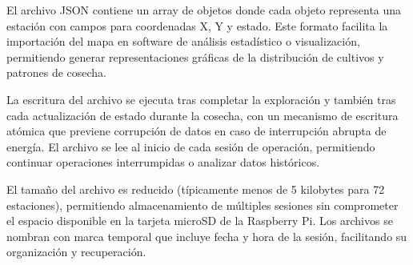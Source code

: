 El archivo JSON contiene un array de objetos donde cada objeto representa una estación con campos para coordenadas X, Y y estado. Este formato facilita la importación del mapa en software de análisis estadístico o visualización, permitiendo generar representaciones gráficas de la distribución de cultivos y patrones de cosecha.

La escritura del archivo se ejecuta tras completar la exploración y también tras cada actualización de estado durante la cosecha, con un mecanismo de escritura atómica que previene corrupción de datos en caso de interrupción abrupta de energía. El archivo se lee al inicio de cada sesión de operación, permitiendo continuar operaciones interrumpidas o analizar datos históricos.

El tamaño del archivo es reducido (típicamente menos de 5 kilobytes para 72 estaciones), permitiendo almacenamiento de múltiples sesiones sin comprometer el espacio disponible en la tarjeta microSD de la Raspberry Pi. Los archivos se nombran con marca temporal que incluye fecha y hora de la sesión, facilitando su organización y recuperación.